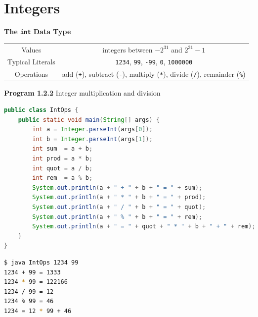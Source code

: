 \documentclass[8pt,a4paper,compress]{beamer}
\begin{document}
\section{Integers}
\begin{frame}[fragile]
\pause

\textbf{The \lstinline$int$ Data Type}

\begin{center}
\begin{tabular}{c|c}
Values & integers between $-2^{31}$ and $2^{31}-1$ \\ 
Typical Literals & \lstinline$1234$, \lstinline$99$, \lstinline$-99$, \lstinline$0$, \lstinline$1000000$ \\ 
Operations & add (\lstinline$+$), subtract (\lstinline$-$), multiply (\lstinline$*$), divide (\lstinline$/$), remainder (\lstinline$%$) \\ 
\end{tabular} 
\end{center}

\pause
\smallskip

\textbf{Program 1.2.2} Integer multiplication and division

\begin{lstlisting}[language=Java]
public class IntOps { 
    public static void main(String[] args) {
        int a = Integer.parseInt(args[0]);
        int b = Integer.parseInt(args[1]);
        int sum  = a + b;
        int prod = a * b;
        int quot = a / b;
        int rem  = a % b;
        System.out.println(a + " + " + b + " = " + sum);
        System.out.println(a + " * " + b + " = " + prod);
        System.out.println(a + " / " + b + " = " + quot);
        System.out.println(a + " % " + b + " = " + rem);
        System.out.println(a + " = " + quot + " * " + b + " + " + rem);
    }
}
\end{lstlisting}

\pause

\begin{lstlisting}[language=bash]
$ java IntOps 1234 99
1234 + 99 = 1333
1234 * 99 = 122166
1234 / 99 = 12
1234 % 99 = 46
1234 = 12 * 99 + 46
\end{lstlisting}
\end{frame}
\end{document}
